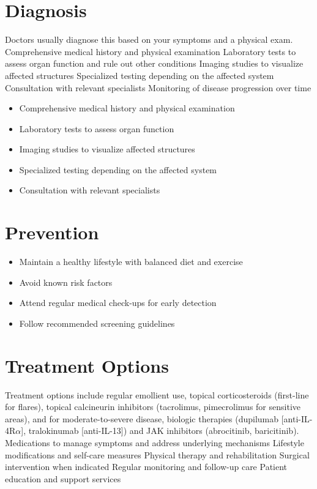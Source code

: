 \section{Diagnosis}
Doctors usually diagnose this based on your symptoms and a physical exam. Comprehensive medical history and physical examination Laboratory tests to assess organ function and rule out other conditions Imaging studies to visualize affected structures Specialized testing depending on the affected system Consultation with relevant specialists Monitoring of disease progression over time

\begin{itemize}[noitemsep]
  \item Comprehensive medical history and physical examination
  \item Laboratory tests to assess organ function
  \item Imaging studies to visualize affected structures
  \item Specialized testing depending on the affected system
  \item Consultation with relevant specialists
\end{itemize}
\section{Prevention}
\begin{itemize}[noitemsep]
  \item Maintain a healthy lifestyle with balanced diet and exercise
  \item Avoid known risk factors
  \item Attend regular medical check-ups for early detection
  \item Follow recommended screening guidelines
\end{itemize}
\section{Treatment Options}
Treatment options include regular emollient use, topical corticosteroids (first-line for flares), topical calcineurin inhibitors (tacrolimus, pimecrolimus for sensitive areas), and for moderate-to-severe disease, biologic therapies (dupilumab [anti-IL-4R$\alpha$], tralokinumab [anti-IL-13]) and JAK inhibitors (abrocitinib, baricitinib). Medications to manage symptoms and address underlying mechanisms Lifestyle modifications and self-care measures Physical therapy and rehabilitation Surgical intervention when indicated Regular monitoring and follow-up care Patient education and support services

